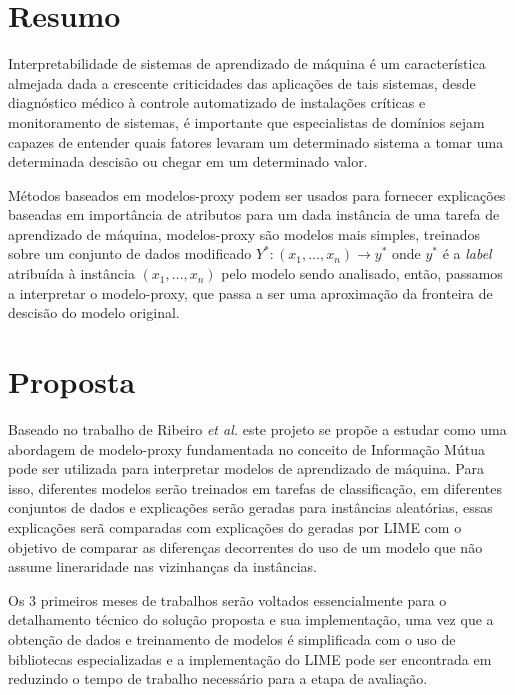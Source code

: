 \documentclass{article}
\begin{document}
\section*{Resumo}
\label{sec:resumo}
Interpretabilidade de sistemas de aprendizado de máquina é um
característica almejada dada a crescente criticidades das aplicações
de tais sistemas, desde diagnóstico médico à controle automatizado
de instalações críticas e monitoramento de sistemas, é importante que
especialistas de domínios sejam capazes de entender quais fatores
levaram um determinado sistema a tomar uma determinada descisão ou
chegar em um determinado valor.

Métodos baseados em modelos-proxy podem ser usados para fornecer
explicações baseadas em importância de atributos para um dada instância
de uma tarefa de aprendizado de máquina, modelos-proxy são modelos
mais simples, treinados sobre um conjunto de dados modificado $Y^*:
(x_1,\dots,x_n) \rightarrow y^*$
onde $y^*$ é a \textit{label} atribuída à instância $(x_1,\dots,x_n)$ pelo
modelo sendo analisado, então, passamos a interpretar o modelo-proxy, que passa
a ser uma aproximação da fronteira de descisão do modelo original.

\section*{Proposta}
\label{sec:proposta}

Baseado no trabalho de Ribeiro \textit{et al.}\cite{lime} este projeto se propõe
a estudar como uma abordagem de modelo-proxy fundamentada no conceito
de Informação Mútua pode ser utilizada para interpretar modelos de aprendizado
de máquina. Para isso, diferentes modelos serão treinados em tarefas de
classificação, em diferentes conjuntos de dados e explicações serão geradas
para instâncias aleatórias, essas explicações serã comparadas com explicações do
geradas por LIME \cite{lime} com o objetivo de comparar as diferenças
decorrentes do uso de um modelo que não assume lineraridade nas vizinhanças
da instâncias.

Os 3 primeiros meses de trabalhos serão voltados essencialmente para o detalhamento
técnico do solução proposta e sua implementação, uma vez que a obtenção de
dados e treinamento de modelos é simplificada com o uso de bibliotecas
especializadas e a implementação do LIME pode ser encontrada em \cite{lime}
reduzindo o tempo de trabalho necessário para a etapa de avaliação.

{}

\end{document}
